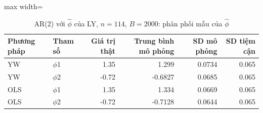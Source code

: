 \begin{table}[H]
\centering\footnotesize
\caption{AR(2) với $\hat\phi$ của LY, $n=114$, $B=2000$: phân phối mẫu của $\hat\phi$}\label{tab:tab_b11_12_simulation}
\begin{adjustbox}{max width=\linewidth}
\begin{tabular}{|l|l|r|r|r|r|}
\toprule
Phương pháp & Tham số & Giá trị thật & Trung bình mô phỏng & SD mô phỏng & SD tiệm cận \\
\midrule
YW & $\phi$1 & 1.35 & 1.299 & 0.0734 & 0.065 \\
YW & $\phi$2 & -0.72 & -0.6827 & 0.0685 & 0.065 \\
OLS & $\phi$1 & 1.35 & 1.334 & 0.0669 & 0.065 \\
OLS & $\phi$2 & -0.72 & -0.7128 & 0.0644 & 0.065 \\
\bottomrule
\end{tabular}
\end{adjustbox}
\end{table}
